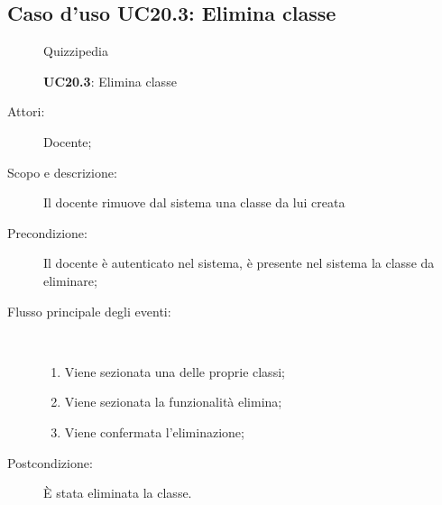 \subsection{Caso d'uso UC20.3: Elimina classe}
	\begin{figure}[H]
		\centering
		\begin{resizedtikzpicture}{\textwidth}
		\begin{umlsystem}[x=0, fill=lightgray!20]{Quizzipedia}
		\end{umlsystem}
		\end{resizedtikzpicture}
		\caption{\textbf{UC20.3}: Elimina classe}
		\label{UC20.3}
	\end{figure}
\begin{description}
\item[Attori:] Docente;
\item[Scopo e descrizione:] Il docente rimuove dal sistema una classe da lui creata 
      \item[Precondizione:] Il docente è autenticato nel sistema, è presente nel sistema la classe da eliminare;

        \item[Flusso principale degli eventi:] \ 
 \begin{enumerate}
          \item Viene sezionata una delle proprie classi;
          \item Viene sezionata la funzionalità elimina;
          \item Viene confermata l'eliminazione;

      \end{enumerate}
    \item[Postcondizione:] È stata eliminata la classe.
  \end{description}
\hypertarget{UC20.4}{}
